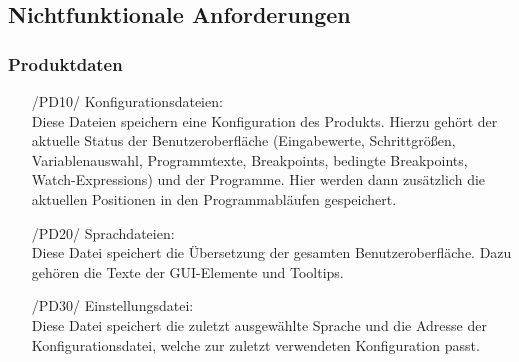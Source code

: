 \documentclass[parskip=full]{scrartcl}
\begin{document}
 \newpage		
 		
	\subsection{Nichtfunktionale Anforderungen}
		\subsubsection{Produktdaten}
		\begin{itemize}
		
		
			\item[/PD10/] Konfigurationsdateien: \\
			Diese Dateien speichern eine Konfiguration des Produkts. 
			Hierzu gehört der aktuelle Status der Benutzeroberfläche (Eingabewerte, Schrittgrößen, Variablenauswahl, Programmtexte, Breakpoints, bedingte Breakpoints, Watch-Expressions) und der Programme.
			Hier werden dann zusätzlich die aktuellen Positionen in den Programmabläufen gespeichert.
			
			\item[/PD20/] Sprachdateien: \\
			Diese Datei speichert die Übersetzung der gesamten Benutzeroberfläche.
			Dazu gehören die Texte der GUI-Elemente und \glspl{Tooltip}.
			
			\item[/PD30/] Einstellungsdatei: \\
			Diese Datei speichert die zuletzt ausgewählte Sprache und die Adresse der \gls{Konfigurationsdatei}, welche zur zuletzt verwendeten Konfiguration passt.  
			\end{itemize}
			
			 
\end{document}
